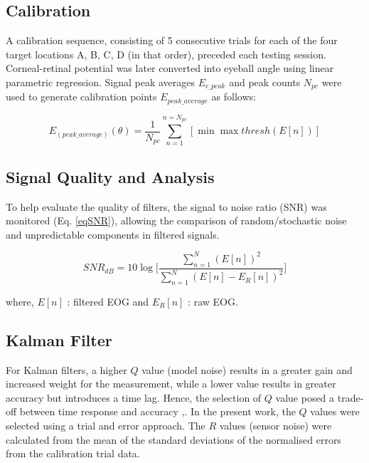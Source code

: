 \documentclass[transmag]{IEEEtran}
\begin{document}
\subsection{Calibration}

A calibration sequence, consisting of 5 consecutive trials for each of the four target locations A, B, C, D (in that order), preceded each testing session. Corneal-retinal potential was later converted into eyeball angle using linear parametric regression. Signal peak averages $E_{e\_peak}$ and peak counts $N_{pc}$ were used to generate calibration points $E_{peak\_average}$ as follows:

\begin{equation}
E_{(peak\_average)}(\theta)= \frac{1}{N_{pc}} \sum_{n=1}^{n=N_{pc}} [\min \max thresh (E[n])] 
\end{equation}



\subsection{Signal Quality and Analysis}

To help evaluate the quality of filters, the signal to noise ratio (SNR) was monitored (Eq. \ref{eqSNR}), allowing the comparison of random/stochastic noise and unpredictable components in  filtered signals. 

\begin{equation}
\label{eqSNR}
SNR_{dB} = 10 \log \bigg[  \frac{\sum_{n=1}^{N}(E[n])^2}{\sum_{n=1}^{N}(E[n]-E_R[n])^2}    \bigg]
\end{equation}


where, $E[n]$ : filtered EOG and $E_R [n]$ : raw EOG. 

\subsection{Kalman Filter}
\label{KFvalues}

For Kalman filters, a higher $Q$ value (model noise) results in a greater gain and increased weight for the measurement, while a lower value results in greater accuracy but introduces a time lag. Hence, the selection of $Q$ value posed a trade-off between time response and accuracy \cite{ref21},\cite{ref22}. In the present work, the $Q$ values were selected using a trial and error approach. The $R$ values (sensor noise) were calculated from the mean of the standard deviations of the normalised errors from the calibration trial data.
\end{document}
